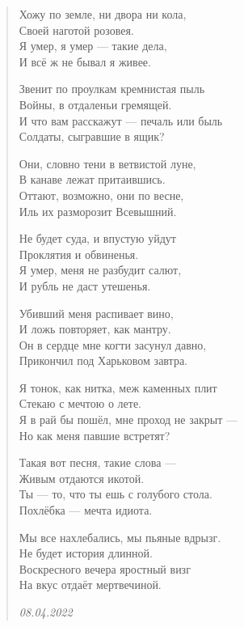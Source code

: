\documentclass[a4paper,12pt,fleqn]{book}\usepackage{polyglossia}\setdefaultlanguage[babelshorthands=true]{russian}\setotherlanguage{english}\defaultfontfeatures{Ligatures=TeX,Mapping=tex-text}\usepackage{xcolor}\newcommand{\ml}[3]{#2}
\begin{document}
\begin{verse}

Хожу по земле, ни двора ни кола,\\
Своей наготой розовея.\\
Я умер, я умер --- такие дела,\\
И всё ж не бывал я живее.

Звенит по проулкам кремнистая пыль\\
Войны, в отдаленьи гремящей.\\
И что вам расскажут --- печаль или быль\\
Солдаты, сыгравшие в ящик?

Они, словно тени в ветвистой луне,\\
В канаве лежат притаившись.\\
Оттают, возможно, они по весне,\\
Иль их разморозит Всевышний.

Не будет суда, и впустую уйдут\\
Проклятия и обвиненья.\\
Я умер, меня не разбудит салют,\\
И рубль не даст утешенья.

Убивший меня распивает вино,\\
И ложь повторяет, как мантру.\\
Он в сердце мне когти засунул давно,\\
Прикончил под Харьковом завтра.

Я тонок, как нитка, меж каменных плит\\
Стекаю с мечтою о лете.\\
Я в рай бы пошёл, мне проход не закрыт ---\\
Но как меня павшие встретят?

Такая вот песня, такие слова ---\\
Живым отдаются икотой.\\
Ты --- то, что ты ешь с голубого стола.\\
Похлёбка --- мечта идиота.

Мы все нахлебались, мы пьяные вдрызг.\\
Не будет история длинной.\\
Воскресного вечера яростный визг\\
На вкус отдаёт мертвечиной.

\emph{08.04.2022}
\end{verse}
\end{document}
